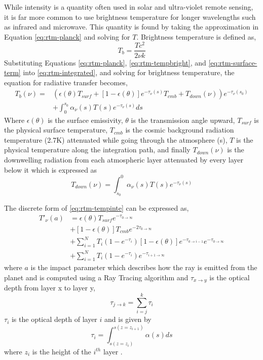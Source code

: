 While intensity is a quantity often used in solar and ultra-violet remote sensing, it is far more common to use brightness temperature for longer wavelengths such as infrared and microwave. This quantity is found by taking the approximation in Equation \ref{eq:rtm-planck} and solving for $T$. Brightness temperature is defined as,
\begin{equation}\label{eq:rtm-tempbright}
T_b = \frac{Tc^2}{2\nu k}
\end{equation}
Substituting Equations \ref{eq:rtm-planck}, \ref{eq:rtm-tempbright}, and \ref{eq:rtm-surface-term} into \ref{eq:rtm-integrated}, and solving for brightness temperature, the equation for radiative transfer becomes, 
\begin{equation}\label{eq:rtm-tempinte}
\begin{split}
T_b(\nu) = &\left(\epsilon(\theta)T_{surf} + [1-\epsilon(\theta)]e^{-\tau_\nu(s)}T_{cmb}+ T_{down}(\nu)\right)e^{-\tau_\nu(s_0)}\\
&+\int_0^{s_0} \alpha_\nu(s)T(s) e^{-\tau_\nu(s)}ds
\end{split}
\end{equation}
Where $\epsilon(\theta)$ is the surface emissivity, $\theta$ is the transmission angle upward, $T_{surf}$ is the physical surface temperature, $T_{cmb}$ is the cosmic background radiation temperature (2.7K) attenuated while going through the atmosphere (s), $T$ is the physical temperature along the integration path, and finally $T_{down}(\nu)$ is the downwelling radiation from each atmospheric layer attenuated by every layer below it which is expressed as
\begin{equation}
T_{down}(\nu) = \int_{s_0}^{0} \alpha_\nu(s)T(s) e^{-\tau_\nu(s)}
\end{equation}  

The discrete form of \ref{eq:rtm-tempinte} can be expressed as,
\begin{equation}\label{eq:rtm-layers}
\begin{split}
T'_\nu(a) &= \epsilon(\theta)T_{surf} e^{-\tau_{0\rightarrow \infty}} \\
&+ [1-\epsilon(\theta)]T_{cmb}e^{-2\tau_{0\rightarrow\infty}}\\
&+ \sum_{i=1}^N T_i(1-e^{-\tau_i})[1-\epsilon(\theta)] e^{-\tau_{0\rightarrow i-1}} e^{-\tau_{0\rightarrow \infty}}\\
&+ \sum_{i=1}^N T_i(1-e^{-\tau_i}) e^{-\tau_{i+1\rightarrow \infty}} 
\end{split}
\end{equation}
where $a$ is the impact parameter which describes how the ray is emitted from the planet and is computed using a Ray Tracing algorithm and $\tau_{x\rightarrow y}$ is the optical depth from layer x to layer y, 
\begin{equation}\label{eq:rtm-layersum}
\tau_{j\rightarrow k} = \sum_{i=j}^k \tau_i
\end{equation}
$\tau_i$ is the optical depth of layer $i$ and is given by
\begin{equation}\label{eq:rtm-layerdepth}
\tau_i = \int_{s(z=z_i)}^{s(z=z_{i+1})} \alpha(s) ds
\end{equation}
where $z_i$ is the height of the $i^{th}$ layer \cite{Jenkins-2002}. 

